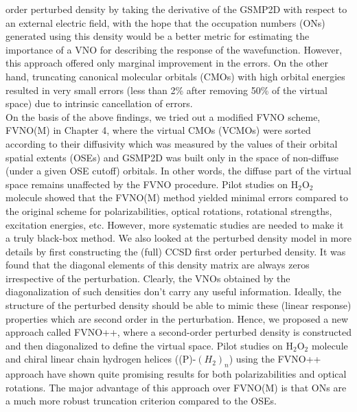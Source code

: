 order perturbed density by taking the derivative of the GSMP2D with 
respect to an external electric field, with the hope that the occupation 
numbers (ONs) generated using this density would be a better metric for 
estimating the importance of a VNO for describing the response of the 
wavefunction. However, this approach offered only marginal improvement 
in the errors. On the other hand, truncating canonical molecular orbitals (CMOs) 
with high orbital energies resulted in very small errors (less than 2\% after 
removing 50\% of the virtual space) due to intrinsic cancellation of errors.\\
On the basis of the above findings, we tried out a modified FVNO scheme, FVNO(M)
in Chapter 4, where the virtual CMOs (VCMOs) were sorted according to their diffusivity which 
was measured by the values of their orbital spatial extents (OSEs) and GSMP2D was 
built only in the space of non-diffuse (under a given OSE cutoff) orbitals. 
In other words, the diffuse part of the virtual space remains unaffected 
by the FVNO procedure. Pilot studies on H$_2$O$_2$ molecule showed that the
FVNO(M) method yielded minimal errors compared to the original scheme 
for polarizabilities, optical rotations, rotational strengths, 
excitation energies, etc. However, more systematic studies are needed to 
make it a truly black-box method. We also looked at the perturbed density 
model in more details by first constructing the (full) CCSD first order 
perturbed density. It was found that the diagonal elements of this density 
matrix are always zeros irrespective of the perturbation. Clearly, the VNOs
obtained by the diagonalization of such densities don't carry any useful information.
Ideally, the structure of the perturbed density should be able to mimic these (linear response) properties 
which are second order in the perturbation. Hence, we proposed a new approach called
FVNO++, where a second-order perturbed density is constructed and then diagonalized
to define the virtual space. Pilot studies on H$_2$O$_2$ molecule and chiral linear chain
hydrogen helices ((P)-$(H_2)_n$) using the FVNO++ approach have shown quite promising results 
for both polarizabilities and optical rotations. The major advantage of this approach 
over FVNO(M) is that ONs are a much more robust truncation criterion compared to the OSEs.\\
